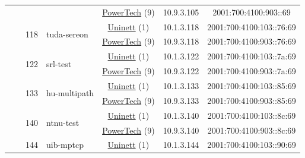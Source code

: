 \begin{small}
\begin{center}
\begin{longtable}{|c|c|c|c|c|c|c|c|}
  &  & \multicolumn{2}{|c|}{} & \multicolumn{2}{|c|}{\tiny{\href{http://www.powertech.no}{PowerTech} (9)}} & \tiny{10.9.3.105} & \tiny{2001:700:4100:903::69} \\* \cline{3-3}\cline{4-4}\cline{5-5}\cline{6-6}\cline{7-7}\cline{8-8}
  &  & \multirow{2}{*}{\tiny{118}} & \multicolumn{1}{|l|}{\multirow{2}{*}{\tiny{tuda-sereon}}} & \multicolumn{2}{|c|}{\tiny{\href{https://www.uninett.no}{Uninett} (1)}} & \tiny{10.1.3.118} & \tiny{2001:700:4100:103::76:69} \\* \cline{5-5}\cline{6-6}\cline{7-7}\cline{8-8}
  &  &  &  & \multicolumn{2}{|c|}{\tiny{\href{http://www.powertech.no}{PowerTech} (9)}} & \tiny{10.9.3.118} & \tiny{2001:700:4100:903::76:69} \\* \cline{3-3}\cline{4-4}\cline{5-5}\cline{6-6}\cline{7-7}\cline{8-8}
  &  & \multirow{2}{*}{\tiny{122}} & \multicolumn{1}{|l|}{\multirow{2}{*}{\tiny{srl-test}}} & \multicolumn{2}{|c|}{\tiny{\href{https://www.uninett.no}{Uninett} (1)}} & \tiny{10.1.3.122} & \tiny{2001:700:4100:103::7a:69} \\* \cline{5-5}\cline{6-6}\cline{7-7}\cline{8-8}
  &  &  &  & \multicolumn{2}{|c|}{\tiny{\href{http://www.powertech.no}{PowerTech} (9)}} & \tiny{10.9.3.122} & \tiny{2001:700:4100:903::7a:69} \\* \cline{3-3}\cline{4-4}\cline{5-5}\cline{6-6}\cline{7-7}\cline{8-8}
  &  & \multirow{2}{*}{\tiny{133}} & \multicolumn{1}{|l|}{\multirow{2}{*}{\tiny{hu-multipath}}} & \multicolumn{2}{|c|}{\tiny{\href{https://www.uninett.no}{Uninett} (1)}} & \tiny{10.1.3.133} & \tiny{2001:700:4100:103::85:69} \\* \cline{5-5}\cline{6-6}\cline{7-7}\cline{8-8}
  &  &  &  & \multicolumn{2}{|c|}{\tiny{\href{http://www.powertech.no}{PowerTech} (9)}} & \tiny{10.9.3.133} & \tiny{2001:700:4100:903::85:69} \\* \cline{3-3}\cline{4-4}\cline{5-5}\cline{6-6}\cline{7-7}\cline{8-8}
  &  & \multirow{2}{*}{\tiny{140}} & \multicolumn{1}{|l|}{\multirow{2}{*}{\tiny{ntnu-test}}} & \multicolumn{2}{|c|}{\tiny{\href{https://www.uninett.no}{Uninett} (1)}} & \tiny{10.1.3.140} & \tiny{2001:700:4100:103::8c:69} \\* \cline{5-5}\cline{6-6}\cline{7-7}\cline{8-8}
  &  &  &  & \multicolumn{2}{|c|}{\tiny{\href{http://www.powertech.no}{PowerTech} (9)}} & \tiny{10.9.3.140} & \tiny{2001:700:4100:903::8c:69} \\* \cline{3-3}\cline{4-4}\cline{5-5}\cline{6-6}\cline{7-7}\cline{8-8}
  &  & \multirow{2}{*}{\tiny{144}} & \multicolumn{1}{|l|}{\multirow{2}{*}{\tiny{uib-mptcp}}} & \multicolumn{2}{|c|}{\tiny{\href{https://www.uninett.no}{Uninett} (1)}} & \tiny{10.1.3.144} & \tiny{2001:700:4100:103::90:69} \\* \cline{5-5}\cline{6-6}\cline{7-7}\cline{8-8}

\end{longtable}
\end{center}
\end{small}
